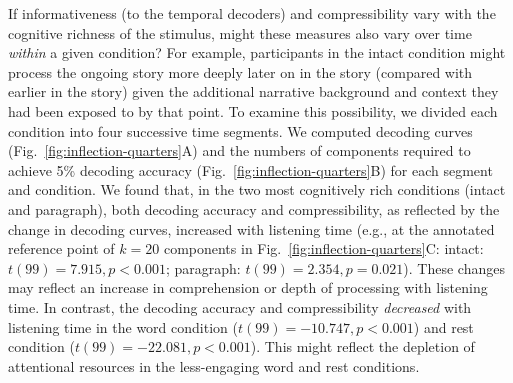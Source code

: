 \documentclass[english, 11pt]{article}
\begin{document}
If informativeness (to the temporal decoders) and compressibility vary with the
cognitive richness of the stimulus, might these measures also vary over time
\textit{within} a given condition? For example, participants in the intact
condition might process the ongoing story more deeply later on in the story
(compared with earlier in the story) given the additional narrative background
and context they had been exposed to by that point. To examine this
possibility, we divided each condition into four successive time segments. We
computed decoding curves (Fig.~\ref{fig:inflection-quarters}A) and the numbers
of components required to achieve 5\% decoding accuracy
(Fig.~\ref{fig:inflection-quarters}B) for each segment and condition. We found
that, in the two most cognitively rich conditions (intact and paragraph), both
decoding accuracy and compressibility, as reflected by the change in decoding
curves, increased with listening time (e.g., at the annotated reference point
of $k = 20$ components in Fig.~\ref{fig:inflection-quarters}C: intact: $t(99) =
7.915, p < 0.001$; paragraph: $t(99) = 2.354, p = 0.021$). These changes may
reflect an increase in comprehension or depth of processing with listening
time. In contrast, the decoding accuracy and compressibility \textit{decreased}
with listening time in the word condition ($t(99) = -10.747, p < 0.001$) and
rest condition ($t(99) = -22.081, p < 0.001$). This might reflect the
depletion of attentional resources in the less-engaging word and rest
conditions.
\end{document}
